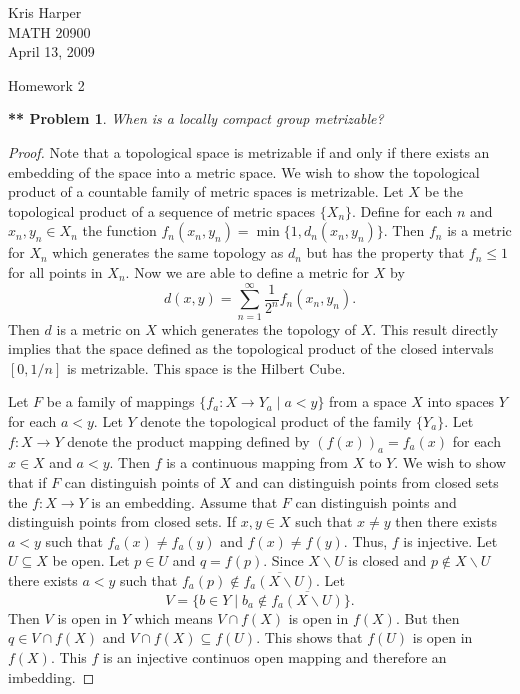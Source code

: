 \documentclass{article}
\newtheorem{**}{** Problem}
\begin{document}
\begin{flushright}
Kris Harper\\

MATH 20900\\

April 13, 2009
\end{flushright}

\begin{center}
Homework 2
\end{center}

\begin{flushleft}

\begin{**}
When is a locally compact group metrizable?
\end{**}
\begin{proof}
Note that a topological space is metrizable if and only if there exists an embedding of the space into a metric space. We wish to show the topological product of a countable family of metric spaces is metrizable. Let $X$ be the topological product of a sequence of metric spaces $\{X_n\}$. Define for each $n$ and $x_n, y_n \in X_n$ the function $f_n(x_n, y_n) = \min\{1, d_n(x_n,y_n)\}$. Then $f_n$ is a metric for $X_n$ which generates the same topology as $d_n$ but has the property that $f_n \leq 1$ for all points in $X_n$. Now we are able to define a metric for $X$ by
\[
d(x,y) = \sum_{n=1}^{\infty} \frac{1}{2^n} f_n(x_n,y_n).
\]
Then $d$ is a metric on $X$ which generates the topology of $X$. This result directly implies that the space defined as the topological product of the closed intervals $[0,1/n]$ is metrizable. This space is the Hilbert Cube.\newline

Let $F$ be a family of mappings $\{f_a : X \rightarrow Y_a \mid a < y\}$ from a space $X$ into spaces $Y$ for each $a < y$. Let $Y$ denote the topological product of the family $\{Y_a\}$. Let $f : X \rightarrow Y$ denote the product mapping defined by $(f(x))_a = f_a(x)$ for each $x \in X$ and $a < y$. Then $f$ is a continuous mapping from $X$ to $Y$. We wish to show that if $F$ can distinguish points of $X$ and can distinguish points from closed sets the $f: X \rightarrow Y$ is an embedding. Assume that $F$ can distinguish points and distinguish points from closed sets. If $x, y \in X$ such that $x \neq y$ then there exists $a < y$ such that $f_a(x) \neq f_a(y)$ and $f(x) \neq f(y)$. Thus, $f$ is injective. Let $U \subseteq X$ be open. Let $p \in U$ and $q = f(p)$. Since $X \backslash U$ is closed and $p \notin X \backslash U$ there exists $a < y$ such that $f_a(p) \notin \overline{f_a(X \backslash U)}$. Let
\[
V = \{b \in Y \mid b_a \notin \overline{f_a(X \backslash U)}\}.
\]
Then $V$ is open in $Y$ which means $V \cap f(X)$ is open in $f(X)$. But then $q \in V \cap f(X)$ and $V \cap f(X) \subseteq f(U)$. This shows that $f(U)$ is open in $f(X)$. This $f$ is an injective continuos open mapping and therefore an imbedding.\newline


\end{proof}
\end{flushleft}
\end{document}

